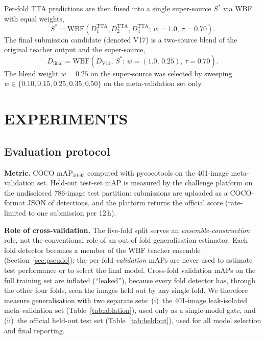\documentclass{article}
\begin{document}
Per-fold TTA predictions are then fused into a single super-source
$S^*$ via WBF with equal weights,
\begin{equation}
  S^* = \mathrm{WBF}\!\left(D^{\mathrm{TTA}}_1, D^{\mathrm{TTA}}_2,
   D^{\mathrm{TTA}}_4;\,w{=}1.0,\,\tau{=}0.70\right).
\end{equation}
The final submission candidate (denoted V17) is a two-source blend of
the original teacher output and the super-source,
\begin{equation}
  D_{\mathrm{final}} = \mathrm{WBF}\!\left(D_{\mathrm{V12}},\,S^*;
   \,w{=}(1.0,\,0.25),\,\tau{=}0.70\right).
\end{equation}
The blend weight $w{=}0.25$ on the super-source was selected by
sweeping $w\!\in\!\{0.10,0.15,0.25,0.35,0.50\}$ on the
meta-validation set only.

\section{EXPERIMENTS}
\label{sec:exp}

\subsection{Evaluation protocol}

\textbf{Metric.} COCO mAP$_{50\text{-}95}$ computed with pycocotools
\cite{lin2014coco} on the 401-image meta-validation set. Held-out
test-set mAP is measured by the challenge platform on the undisclosed
786-image test partition: submissions are uploaded as a COCO-format
JSON of detections, and the platform returns the official score
(rate-limited to one submission per 12\,h).

\textbf{Role of cross-validation.} The five-fold split serves an
\emph{ensemble-construction} role, not the conventional role of an
out-of-fold generalisation estimator. Each fold detector becomes a
member of the WBF teacher ensemble (Section~\ref{sec:pseudo}); the
per-fold \emph{validation} mAPs are never used to estimate test
performance or to select the final model. Cross-fold validation mAPs on
the full training set are inflated (``leaked''), because every fold
detector has, through the other four folds, seen the images held out by
any single fold. We therefore measure generalisation with two separate
sets: (i)~the 401-image leak-isolated meta-validation set
(Table~\ref{tab:ablation}), used only as a single-model gate, and
(ii)~the official held-out test set (Table~\ref{tab:heldout}), used for
all model selection and final reporting.
\end{document}
